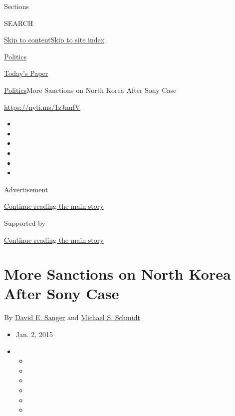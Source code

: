 Sections

SEARCH

\protect\hyperlink{site-content}{Skip to
content}\protect\hyperlink{site-index}{Skip to site index}

\href{https://www.nytimes3xbfgragh.onion/section/politics}{Politics}

\href{https://myaccount.nytimes3xbfgragh.onion/auth/login?response_type=cookie\&client_id=vi}{}

\href{https://www.nytimes3xbfgragh.onion/section/todayspaper}{Today's
Paper}

\href{/section/politics}{Politics}\textbar{}More Sanctions on North
Korea After Sony Case

\url{https://nyti.ms/1zJnnfV}

\begin{itemize}
\item
\item
\item
\item
\item
\item
\end{itemize}

Advertisement

\protect\hyperlink{after-top}{Continue reading the main story}

Supported by

\protect\hyperlink{after-sponsor}{Continue reading the main story}

\hypertarget{more-sanctions-on-north-korea-after-sony-case}{%
\section{More Sanctions on North Korea After Sony
Case}\label{more-sanctions-on-north-korea-after-sony-case}}

By \href{http://www.nytimes3xbfgragh.onion/by/david-e-sanger}{David E.
Sanger} and
\href{http://www.nytimes3xbfgragh.onion/by/michael-s-schmidt}{Michael S.
Schmidt}

\begin{itemize}
\item
  Jan. 2, 2015
\item
  \begin{itemize}
  \item
  \item
  \item
  \item
  \item
  \item
  \end{itemize}
\end{itemize}

